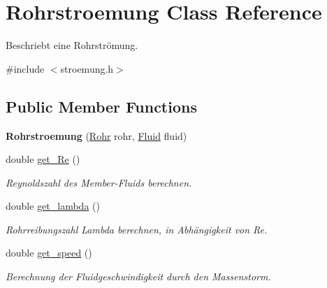 \hypertarget{class_rohrstroemung}{}\section{Rohrstroemung Class Reference}
\label{class_rohrstroemung}


Beschriebt eine Rohrströmung.  




{\ttfamily \#include $<$stroemung.\+h$>$}

\subsection*{Public Member Functions}
\begin{DoxyCompactItemize}
\item 
\mbox{\label{class_rohrstroemung_aafc515ab901ac78c1aef2c615eb38eff}} 
{\bfseries Rohrstroemung} (\hyperlink{class_rohr}{Rohr} rohr, \hyperlink{class_fluid}{Fluid} fluid)
\item 
\mbox{\label{class_rohrstroemung_aa491056aa77acac305aca0fde9c3e8bc}} 
double \hyperlink{class_rohrstroemung_aa491056aa77acac305aca0fde9c3e8bc}{get\+\_\+\+Re} ()
\begin{DoxyCompactList}\small\item\em Reynoldszahl des Member-\/\+Fluids berechnen. \end{DoxyCompactList}\item 
double \hyperlink{class_rohrstroemung_a7ea25aca94625ef68bf856d957419d26}{get\+\_\+lambda} ()
\begin{DoxyCompactList}\small\item\em Rohrreibungszahl Lambda berechnen, in Abhängigkeit von Re. \end{DoxyCompactList}\item 
\mbox{\label{class_rohrstroemung_aa4f7d016ed9f920b8e8f0c9bdbae5213}} 
double \hyperlink{class_rohrstroemung_aa4f7d016ed9f920b8e8f0c9bdbae5213}{get\+\_\+speed} ()
\begin{DoxyCompactList}\small\item\em Berechnung der Fluidgeschwindigkeit durch den Massenstorm. \end{DoxyCompactList}\item 
\mbox{\label{class_rohrstroemung_ac4d2f31e451f1a3c97627d3a87df419d}} 

\end{DoxyCompactItemize}
